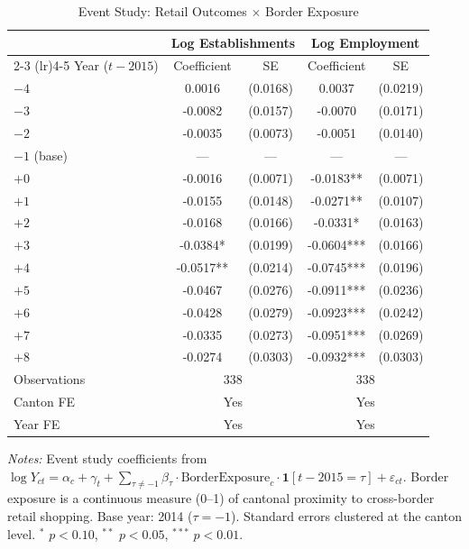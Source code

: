 \begin{table}[t]
\centering
\caption{Event Study: Retail Outcomes $\times$ Border Exposure}
\label{tab:event_study}
\begin{tabular}{lcccc}
\toprule
 & \multicolumn{2}{c}{Log Establishments} & \multicolumn{2}{c}{Log Employment} \\
\cmidrule(lr){2-3} \cmidrule(lr){4-5}
Year ($t - 2015$) & Coefficient & SE & Coefficient & SE \\
\midrule
$-4$ & 0.0016 & (0.0168) & 0.0037 & (0.0219) \\
$-3$ & -0.0082 & (0.0157) & -0.0070 & (0.0171) \\
$-2$ & -0.0035 & (0.0073) & -0.0051 & (0.0140) \\
$-1$ (base) & --- & --- & --- & --- \\
$+0$ & -0.0016 & (0.0071) & -0.0183** & (0.0071) \\
$+1$ & -0.0155 & (0.0148) & -0.0271** & (0.0107) \\
$+2$ & -0.0168 & (0.0166) & -0.0331* & (0.0163) \\
$+3$ & -0.0384* & (0.0199) & -0.0604*** & (0.0166) \\
$+4$ & -0.0517** & (0.0214) & -0.0745*** & (0.0196) \\
$+5$ & -0.0467 & (0.0276) & -0.0911*** & (0.0236) \\
$+6$ & -0.0428 & (0.0279) & -0.0923*** & (0.0242) \\
$+7$ & -0.0335 & (0.0273) & -0.0951*** & (0.0269) \\
$+8$ & -0.0274 & (0.0303) & -0.0932*** & (0.0303) \\
\midrule
Observations & \multicolumn{2}{c}{338} & \multicolumn{2}{c}{338} \\
Canton FE & \multicolumn{2}{c}{Yes} & \multicolumn{2}{c}{Yes} \\
Year FE & \multicolumn{2}{c}{Yes} & \multicolumn{2}{c}{Yes} \\
\bottomrule
\end{tabular}
\begin{tablenotes}
\item \textit{Notes:} Event study coefficients from $\log Y_{ct} = \alpha_c + \gamma_t + \sum_{\tau \neq -1} \beta_\tau \cdot \text{BorderExposure}_c \cdot \mathbf{1}[t - 2015 = \tau] + \varepsilon_{ct}$. Border exposure is a continuous measure (0--1) of cantonal proximity to cross-border retail shopping. Base year: 2014 ($\tau = -1$). Standard errors clustered at the canton level. $^{*}$ $p<0.10$, $^{**}$ $p<0.05$, $^{***}$ $p<0.01$.
\end{tablenotes}
\end{table}

